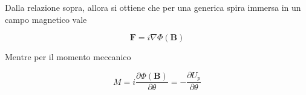 Dalla relazione sopra, allora si ottiene che per una generica spira immersa in un campo magnetico vale 

\begin{tcolorbox}[colback=yellow!10!white, colframe=orange!70!black, boxrule=0.8pt]
\begin{equation}
    \mathbf{F} = i \nabla \Phi (\mathbf{B})
\end{equation}
\end{tcolorbox}

Mentre per il momento meccanico

\begin{tcolorbox}[colback=yellow!10!white, colframe=orange!70!black, boxrule=0.8pt]
\begin{equation}
    M = i \frac{\partial \Phi (\mathbf{B})}{\partial \theta} = - \frac{\partial U_p}{\partial \theta}
\end{equation}
\end{tcolorbox}

